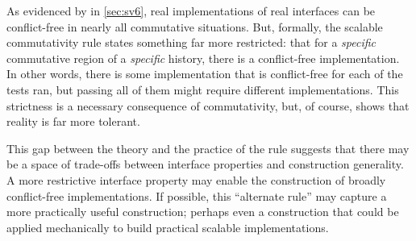 As evidenced by \sys in \cref{sec:sv6}, real implementations of real
interfaces can be conflict-free in nearly all commutative situations.
But, formally, the scalable commutativity rule states something far
more restricted: that for a \emph{specific} commutative region of a
\emph{specific} history, there is a conflict-free implementation.  In
other words, there is some implementation that is conflict-free for
each of the  tests \tool ran, but passing all
of them might require  different
implementations.
%
This strictness is a necessary consequence of \SIM commutativity, but,
of course, \sys shows that reality is far more tolerant.

This gap between the theory and the practice of the rule suggests that
there may be a space of trade-offs between interface properties and
construction generality.
%
A more restrictive interface property may enable the construction of
broadly conflict-free implementations.
%
If possible, this ``alternate rule'' may capture a more practically
useful construction; perhaps even a construction that could be applied
mechanically to build practical scalable implementations.

%
%
%
%

